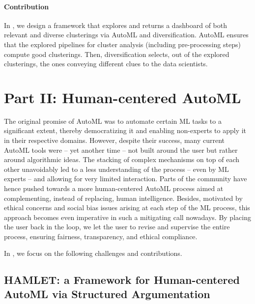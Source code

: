 \paragraph{Contribution} In , we design a framework that explores and returns a dashboard of both relevant and diverse clusterings via AutoML and diversification.
AutoML ensures that the explored pipelines for cluster analysis (including pre-processing steps) compute good clusterings.
Then, diversification selects, out of the explored clusterings, the ones conveying different clues to the data scientists.



\section*{Part II: Human-centered AutoML}

The original promise of AutoML was to automate certain ML tasks to a significant extent, thereby democratizing it and enabling non-experts to apply it in their respective domains.
However, despite their success, many current AutoML tools were -- yet another time -- not built around the user but rather around algorithmic ideas.
The stacking of complex mechanisms on top of each other unavoidably led to a less understanding of the process -- even by ML experts -- and allowing for very limited interaction.
Parts of the community have hence pushed towards a more human-centered AutoML process aimed at complementing, instead of replacing, human intelligence.
Besides, motivated by ethical concerns and social bias issues arising at each step of the ML process, this approach becomes even imperative in such a mitigating call nowadays.
By placing the user back in the loop, we let the user to revise and supervise the entire process, ensuring fairness, transparency, and ethical compliance.

In , we focus on the following challenges and contributions.

\subsection*{HAMLET: a Framework for Human-centered AutoML via Structured Argumentation}


